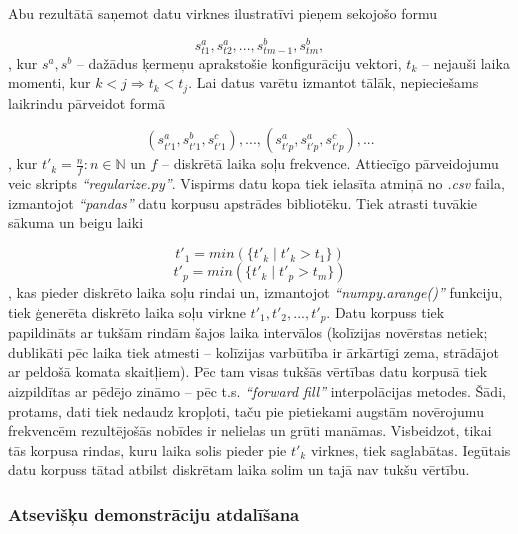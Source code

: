\documentclass[12pt, a4paper]{article}
\numberwithin{equation}{section} %
\begin{document}
Abu rezultātā saņemot datu virknes ilustratīvi pieņem sekojošo formu


\begin{equation}
    s^a_{t1}, s^a_{t2}, ..., s^b_{tm-1}, s^b_{tm},
\end{equation}
, kur $s^a, s^b$ -- dažādus ķermeņu aprakstošie konfigurāciju vektori, $t_k$ -- nejauši laika momenti, kur $k < j \Rightarrow t_k < t_j$. Lai datus varētu izmantot tālāk, nepieciešams laikrindu pārveidot formā

\begin{equation}
    (s^a_{t'1}, s^b_{t'1}, s^c_{t'1}), ..., (s^a_{t'p}, s^a_{t'p}, s^c_{t'p}), ...
\end{equation}
, kur $t'_k = \frac{n}{f}: n \in \mathbb{N}$ un $f$ -- diskrētā laika soļu frekvence. Attiecīgo pārveidojumu veic skripts \textit{``regularize.py''}. Vispirms datu kopa tiek ielasīta atmiņā no \textit{.csv} faila, izmantojot \textit{``pandas''} datu korpusu apstrādes bibliotēku. Tiek atrasti tuvākie sākuma un beigu laiki

\begin{equation}
    t'_1 = min(\lbrace t'_k \mid t'_k > t_1 \rbrace)
\end{equation}
\begin{equation}
    t'_p = min(\lbrace t'_k \mid t'_p > t_m \rbrace)
\end{equation}
, kas pieder diskrēto laika soļu rindai un, izmantojot \textit{``numpy.arange()''} funkciju, tiek ģenerēta diskrēto laika soļu virkne $t'_1, t'_2, ..., t'_p$. Datu korpuss tiek papildināts ar tukšām rindām šajos laika intervālos (kolīzijas novērstas netiek; dublikāti pēc laika tiek atmesti -- kolīzijas varbūtība ir ārkārtīgi zema, strādājot ar peldošā komata skaitļiem). Pēc tam visas tukšās vērtības datu korpusā tiek aizpildītas ar pēdējo zināmo -- pēc t.s. \textit{``forward fill''} interpolācijas metodes. Šādi, protams, dati tiek nedaudz kropļoti, taču pie pietiekami augstām novērojumu frekvencēm rezultējošās nobīdes ir nelielas un grūti manāmas. Visbeidzot, tikai tās korpusa rindas, kuru laika solis pieder pie $t'_k$ virknes, tiek saglabātas. Iegūtais datu korpuss tātad atbilst diskrētam laika solim un tajā nav tukšu vērtību.

\subsubsection{Atsevišķu demonstrāciju atdalīšana}
\end{document}
